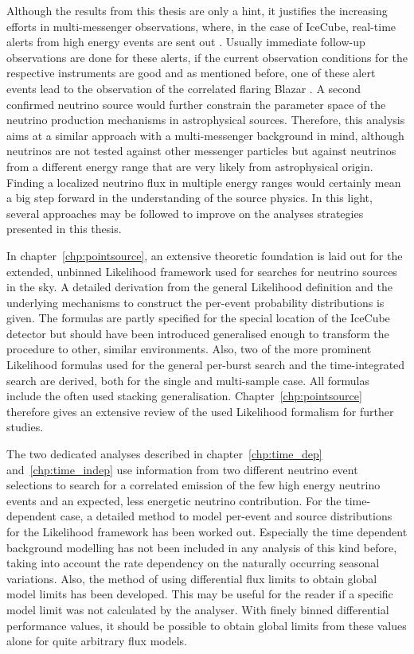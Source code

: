 Although the results from this thesis are only a hint, it justifies the increasing efforts in multi-messenger observations, where, in the case of IceCube, real-time alerts from high energy events are sent out \cite{Aartsen:2016lmt}.
Usually immediate follow-up observations are done for these alerts, if the current observation conditions for the respective instruments are good \cite{DeLotto:2017ggz} and as mentioned before, one of these alert events lead to the observation of the correlated flaring Blazar \cite{IceCube:2018cha}.
A second confirmed neutrino source would further constrain the parameter space of the neutrino production mechanisms in astrophysical sources.
Therefore, this analysis aims at a similar approach with a multi-messenger background in mind, although neutrinos are not tested against other messenger particles but against neutrinos from a different energy range that are very likely from astrophysical origin.
Finding a localized neutrino flux in multiple energy ranges would certainly mean a big step forward in the understanding of the source physics.
In this light, several approaches may be followed to improve on the analyses strategies presented in this thesis.

In chapter~\ref{chp:pointsource}, an extensive theoretic foundation is laid out for the extended, unbinned Likelihood framework used for searches for neutrino sources in the sky.
A detailed derivation from the general Likelihood definition and the underlying mechanisms to construct the per-event probability distributions is given.
The formulas are partly specified for the special location of the IceCube detector but should have been introduced generalised enough to transform the procedure to other, similar environments.
Also, two of the more prominent Likelihood formulas used for the general per-burst search and the time-integrated search are derived, both for the single and multi-sample case.
All formulas include the often used stacking generalisation.
Chapter~\ref{chp:pointsource} therefore gives an extensive review of the used Likelihood formalism for further studies.

The two dedicated analyses described in chapter~\ref{chp:time_dep} and~\ref{chp:time_indep} use information from two different neutrino event selections to search for a correlated emission of the few high energy neutrino events and an expected, less energetic neutrino contribution.
For the time-dependent case, a detailed method to model per-event and source distributions for the Likelihood framework has been worked out.
Especially the time dependent background modelling has not been included in any analysis of this kind before, taking into account the rate dependency on the naturally occurring seasonal variations.
Also, the method of using differential flux limits to obtain global model limits has been developed.
This may be useful for the reader if a specific model limit was not calculated by the analyser.
With finely binned differential performance values, it should be possible to obtain global limits from these values alone for quite arbitrary flux models.


